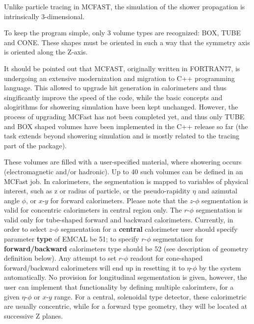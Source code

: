 Unlike particle tracing in MCFAST, the simulation of the shower propagation is
intrinsically 3-dimensional. 
\par
To keep the program simple, only 3 volume  types
are recognized: BOX, TUBE and CONE. These shapes must be oriented  in such a
way that the symmetry axis is oriented along the Z-axis. 
\par
It should be pointed out that MCFAST, originally written in FORTRAN77,  
is undergoing an extensive modernization and migration to C++ programming language.
This allowed to upgrade hit generation in calorimeters and thus singificantly 
improve the speed of the code, while the basic concepts and alogirithms for 
showering simulation have been kept unchanged.
However, the process of upgrading MCFast has not been completed yet, and thus only TUBE 
and BOX shaped volumes have been implemented in the C++ release so far (the task extends beyond
showering simulation and is mostly related to the tracing part of the package).
\par
These volumes are filled with a user-specified material, where showering 
occurs (electromagnetic and/or hadronic).  
Up to 40 such volumes can be defined in an MCFast job. 
In calorimeters, the segmentation is mapped to variables of physical interest,
such as z or radius of particle, or the pseudo-rapidity $\eta$ and azimutal 
angle $\phi$, or $x$-$y$ for forward calorimeters.
Please note that the $z$-$\phi$ segmentation is  valid 
for concentric calorimeters in central region only. The $r$-$\phi$ segmentation
is valid only for tube-shaped forward and backward calorimeters. 
Currently, in order to select $z$-$\phi$ segmentation
for a {\bf central} calorimeter user should specify parameter {\bf type} 
of EMCAL be 51; to specify $r$-$\phi$ segmentation for {\bf forward/backward}
calorimeters type should be 52 (see description of geometry definition below).  
Any attempt to set $r$-$\phi$ readout for cone-shaped forward/backward
calorimeters will end up in resetting it to $\eta$-$\phi$ by the system 
automatically.  
No provision for longitudinal segementation is given, however,
the user can implement that functionality by defining multiple calorimters, 
for a given  $\eta$-$\phi$ or $x$-$y$ range.  For a central, solenoidal type 
detector, 
these calorimetric are usually concentric, while for a forward type geometry,
they will be located at successive Z planes.  
 
